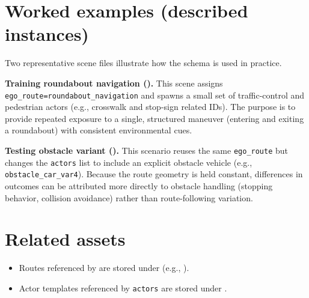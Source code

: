 \endgroup

\section{Worked examples (described instances)}
Two representative scene files illustrate how the schema is used in practice.

\textbf{Training roundabout navigation ().}
This scene assigns \texttt{ego\_route=roundabout\_navigation} and spawns a small set of traffic-control and pedestrian actors (e.g., crosswalk and stop-sign related IDs). The purpose is to provide repeated exposure to a single, structured maneuver (entering and exiting a roundabout) with consistent environmental cues.

\textbf{Testing obstacle variant ().}
This scenario reuses the same \texttt{ego\_route} but changes the \texttt{actors} list to include an explicit obstacle vehicle (e.g., \texttt{obstacle\_car\_var4}). Because the route geometry is held constant, differences in outcomes can be attributed more directly to obstacle handling (stopping behavior, collision avoidance) rather than route-following variation.

\section{Related assets}
\begin{itemize}[leftmargin=*]
  \item Routes referenced by \texttt{} are stored under  (e.g., ).
  \item Actor templates referenced by \texttt{actors} are stored under .
\end{itemize}
